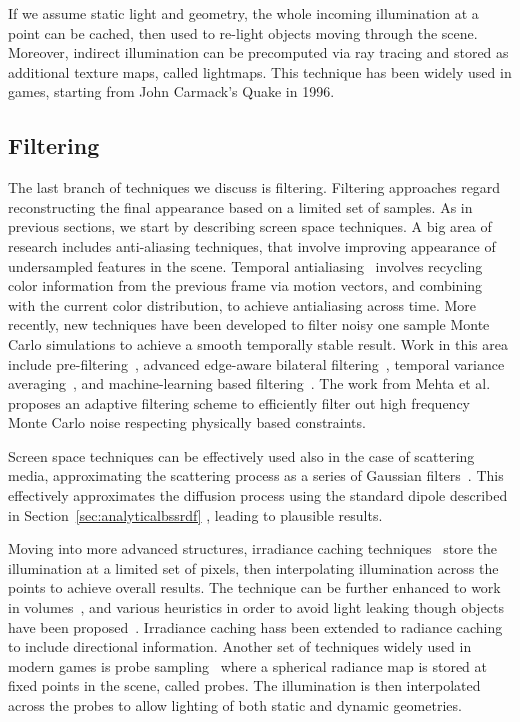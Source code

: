 If we assume static light and geometry, the whole incoming illumination at a point can be cached, then used to re-light objects moving through the scene. Moreover, indirect illumination can be precomputed via ray tracing and stored as additional texture maps, called lightmaps. This technique has been widely used in games, starting from John Carmack's Quake in 1996.    

\subsection{Filtering}

The last branch of techniques we discuss is filtering. Filtering approaches regard reconstructing the final appearance based on a limited set of samples. As in previous sections, we start by describing screen space techniques. A big area of research includes anti-aliasing techniques, that involve improving appearance of undersampled features in the scene. Temporal antialiasing~\cite{Karis2014,Patney2016} involves recycling color information from the previous frame via motion vectors, and combining with the current color distribution, to achieve antialiasing across time. More recently, new techniques have been developed to filter noisy one sample Monte Carlo simulations to achieve a smooth temporally stable result. Work in this area include pre-filtering~\cite{Crassin2015}, advanced edge-aware bilateral filtering~\cite{Mara2017}, temporal variance averaging~\cite{Schied17}, and machine-learning based filtering~\cite{Chaitanya2017}. The work from Mehta et al.~\cite{Mehta2013} proposes an adaptive filtering scheme to efficiently filter out high frequency Monte Carlo noise respecting physically based constraints.

Screen space techniques can be effectively used also in the case of scattering media, approximating the scattering process as a series of Gaussian filters~\cite{Jimenez2015}. This effectively approximates the diffusion process using the standard dipole described in Section~\ref{sec:analyticalbssrdf} \cite{Jensen2001}, leading to plausible results. 

Moving into more advanced structures, irradiance caching techniques~\cite{Ward1988, Tole2002} store the illumination at a limited set of pixels, then interpolating illumination across the points to achieve overall results. The technique can be further enhanced to work in volumes~\cite{Greger1998}, and various heuristics in order to avoid light leaking though objects have been proposed~\cite{Gautron2009}. Irradiance caching hass been extended to radiance caching to include directional information. Another set of techniques widely used in modern games is probe sampling~\cite{Levoy1996,Hooker2016, McGuire2017,Silvennoinen2017} where a spherical radiance map is stored at fixed points in the scene, called probes. The illumination is then interpolated across the probes to allow lighting of both static and dynamic geometries. 

